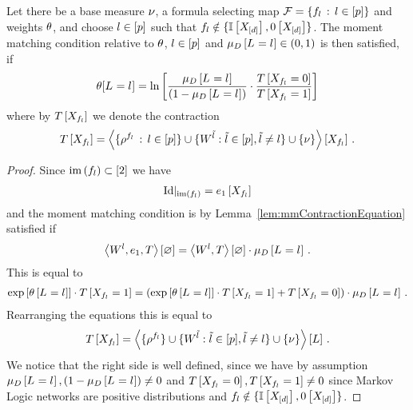 \begin{lemma}\label{ref:lemMMinMLN}
	Let there be a base measure $\nu$, a formula selecting map $\mathcal{F}=\{f_{l} \, : \, l\in[p]\}$ and weights $\theta$, and choose $l\in[p]$ such that $f_{l}  \notin \{\mathbb{I}\left[X_{[d]}\right],0\left[X_{[d]}\right]\}$.	
	The moment matching condition relative to $\theta$, $l\in[p]$ and $\mu_{D}\left[L_{}=l_{}\right]\in(0,1)$ is then satisfied, if
	\begin{align} \label{sol:momentMatchingExformula}
	 	\theta[L_{}=l_{}] = \ln \left[ 
		\frac{\mu_{D}\left[L_{}=l_{}\right]}{(1-\mu_{D}\left[L_{}=l_{}\right])} 
		\cdot \frac{T\left[X_{f_{l} }=0\right]}{T\left[X_{f_{l} }=1\right]} 
		 \right] 
	\end{align}
	where by $T\left[X_{f_{l} }\right]$ we denote the contraction 
	\begin{align*}
	 	T\left[X_{f_{l}}\right] 
		= \left\langle \{\rho^{f_{l}} \, : \, l\in[p]\}
		\cup\{W^{\tilde{l}} : \tilde{l} \in [p], \tilde{l}\neq l\}
		\cup\{\nu\}\right\rangle \left[ X_{f_{l}} \right] \, . 
	\end{align*}
\end{lemma}
\begin{proof}
	Since $\mathrm{im}\left(f_{l}\right)\subset[2]$ we have
	\begin{align*}
		{\mathrm{Id}}|_{\mathrm{im}\left(f_{l}\right)} = e_{1}\left[X_{f_{l}}\right]
	\end{align*}
	and the moment matching condition is by Lemma~\ref{lem:mmContractionEquation} satisfied if
	\begin{align*}
		\left\langle W^{l}, e_{1}, T\right\rangle \left[ \varnothing \right]
			= \left\langle W^{l},T\right\rangle \left[ \varnothing \right] \cdot \mu_{D}\left[L_{}=l_{}\right] \, . 
	\end{align*}
	This is equal to 
	\begin{align*}
		\mathrm{exp}\left[\theta\left[L_{}=l_{}\right]\right] \cdot T\left[X_{f_{l}}=1\right]
		= \left( \mathrm{exp}\left[\theta\left[L_{}=l_{}\right]\right] \cdot T\left[X_{f_{l}}=1\right] + T\left[X_{f_{l}}=0\right] \right) \cdot \mu_{D}\left[L_{}=l_{}\right] \, . 
	\end{align*}
	Rearranging the equations this is equal to 
	\begin{align*}
	 	T\left[X_{f_{l}}\right] 
		= \left\langle \{\rho^{f_{l}}\}
		\cup\{W^{\tilde{l}} : \tilde{l} \in [p], \tilde{l}\neq l\}
		\cup\{\nu\}\right\rangle \left[ L \right] \, . 
	\end{align*}
	We notice that the right side is well defined, since we have by assumption $\mu_{D}\left[L_{}=l_{}\right], (1- \mu_{D}\left[L_{}=l_{}\right]) \neq 0$ and $T\left[X_{f_{l}}=0\right], T\left[X_{f_{l}}=1\right] \neq 0$ since Markov Logic networks are positive distributions and $f_{l} \notin \{\mathbb{I}\left[X_{[d]}\right],0\left[X_{[d]}\right]\}$.
\end{proof}


